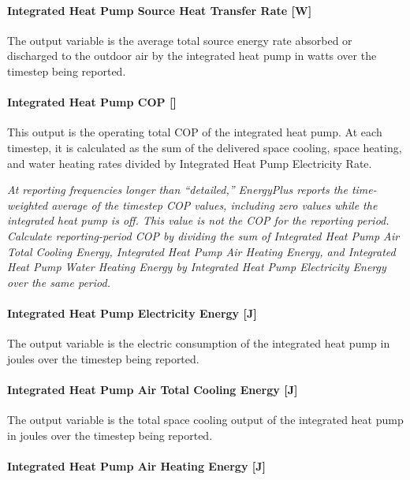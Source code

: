 \paragraph{Integrated Heat Pump Source Heat Transfer Rate {[}W{]}}\label{Out-Total-Source-Energy-Rate-ASIHP}

The output variable is the average total source energy rate absorbed or discharged to the outdoor air by the integrated heat pump in watts over the timestep being reported.


\paragraph{Integrated Heat Pump COP {[}{]}}\label{Out-Tot-COP-ASIHP}

This output is the operating total COP of the integrated heat pump. At each timestep, it is calculated as the sum of the delivered space cooling, space heating, and water heating rates divided by Integrated Heat Pump Electricity Rate.

\emph{At reporting frequencies longer than ``detailed,'' EnergyPlus reports the time-weighted average of the timestep COP values, including zero values while the integrated heat pump is off. This value is not the COP for the reporting period. Calculate reporting-period COP by dividing the sum of Integrated Heat Pump Air Total Cooling Energy, Integrated Heat Pump Air Heating Energy, and Integrated Heat Pump Water Heating Energy by Integrated Heat Pump Electricity Energy over the same period.}


\paragraph{Integrated Heat Pump Electricity Energy {[}J{]}}\label{Out-Total-Electric-Energy-ASIHP}

The output variable is the electric consumption of the integrated heat pump in joules over the timestep being reported.


\paragraph{Integrated Heat Pump Air Total Cooling Energy {[}J{]}}\label{Out-Total-Cooling-Energy-ASIHP}
The output variable is the total space cooling output of the integrated heat pump in joules over the timestep being reported.


\paragraph{Integrated Heat Pump Air Heating Energy {[}J{]}}\label{Out-Total-Air-Heating-Energy-ASIHP}

